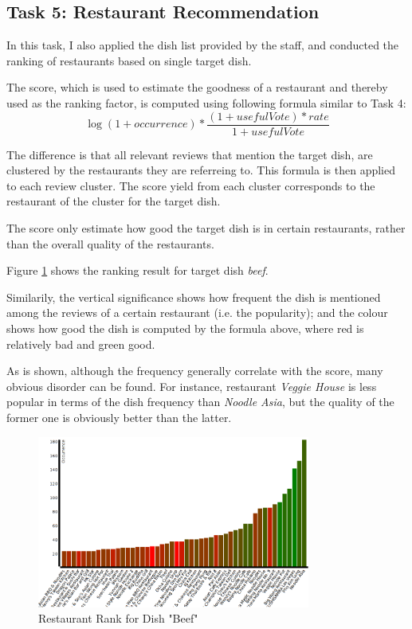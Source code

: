 \documentclass[11pt]{article}
\begin{document}
\subsection{Task 5: Restaurant Recommendation}
In this task, I also applied the dish list provided by the staff, and conducted the ranking of restaurants based on single target dish.

The score, which is used to estimate the goodness of a restaurant and thereby used as the ranking factor, is computed using following formula similar to Task 4:
$$\log(1 + occurrence) * \frac{(1 + usefulVote) * rate}{1 + usefulVote}$$

The difference is that all relevant reviews that mention the target dish, are clustered by the restaurants they are referreing to.
This formula is then applied to each review cluster.
The score yield from each cluster corresponds to the restaurant of the cluster for the target dish.

The score only estimate how good the target dish is in certain restaurants, rather than the overall quality of the restaurants.

\vspace{1.5em}
Figure \ref{fig:rest_rank} shows the ranking result for target dish \emph{beef}.

Similarily, the vertical significance shows how frequent the dish is mentioned among the reviews of a certain restaurant (i.e. the popularity);
and the colour shows how good the dish is computed by the formula above, where red is relatively bad and green good.

As is shown, although the frequency generally correlate with the score, many obvious disorder can be found.
For instance, restaurant \emph{Veggie House} is less popular in terms of the dish frequency than \emph{Noodle Asia}, but the quality of the former one is obviously better than the latter.

\begin{figure}[htp!]
  \centering
  \includegraphics[width=0.8\textwidth]{./img/rest_rank.png}
  \caption{Restaurant Rank for Dish "Beef"}
  \label{fig:rest_rank}
\end{figure}
\end{document}
